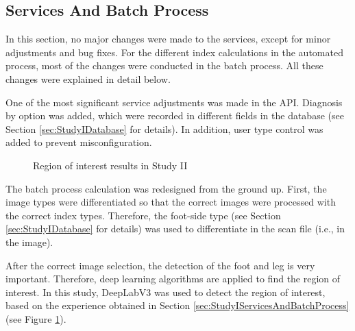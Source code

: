 \subsection{Services And Batch Process}

In this section, no major changes were made to the services, except for minor adjustments and bug fixes. For the different index calculations in the automated process, most of the changes were conducted in the batch process. All these changes were explained in detail below.

One of the most significant service adjustments was made in the API. Diagnosis by option was added, which were recorded in different fields in the database (see Section \ref{sec:StudyIDatabase} for details). In addition, user type control was added to prevent misconfiguration.

\begin{figure}[htbp]
\centering
{}
\caption{Region of interest results in Study II}
\label{fig:BatchProcessRioStudyII}
\end{figure}

The batch process calculation was redesigned from the ground up. First, the image types were differentiated so that the correct images were processed with the correct index types. Therefore, the foot-side type (see Section \ref{sec:StudyIDatabase} for details) was used to differentiate in the scan file (i.e., in the image).

After the correct image selection, the detection of the foot and leg is very important. Therefore, deep learning algorithms are applied to find the region of interest. In this study, DeepLabV3 was used to detect the region of interest, based on the experience obtained in Section \ref{sec:StudyIServicesAndBatchProcess} (see Figure \ref{fig:BatchProcessRioStudyII}).

